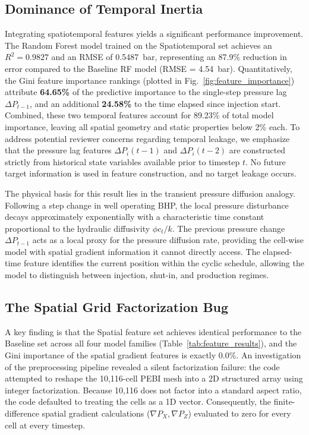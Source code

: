 \documentclass[10pt,twocolumn]{article}
\begin{document}
\subsection{Dominance of Temporal Inertia}
Integrating spatiotemporal features yields a significant performance improvement. The Random Forest model trained on the Spatiotemporal set achieves an $R^2 = 0.9827$ and an RMSE of 0.5487~bar, representing an 87.9\% reduction in error compared to the Baseline RF model (RMSE = 4.54~bar). Quantitatively, the Gini feature importance rankings (plotted in Fig.~\ref{fig:feature_importance}) attribute \textbf{64.65\%} of the predictive importance to the single-step pressure lag $\Delta P_{t-1}$, and an additional \textbf{24.58\%} to the time elapsed since injection start. Combined, these two temporal features account for 89.23\% of total model importance, leaving all spatial geometry and static properties below 2\% each. To address potential reviewer concerns regarding temporal leakage, we emphasize that the pressure lag features $\Delta P_i(t-1)$ and $\Delta P_i(t-2)$ are constructed strictly from historical state variables available prior to timestep $t$. No future target information is used in feature construction, and no target leakage occurs.

The physical basis for this result lies in the transient pressure diffusion analogy. Following a step change in well operating BHP, the local pressure disturbance decays approximately exponentially with a characteristic time constant proportional to the hydraulic diffusivity $\phi c_t / k$. The previous pressure change $\Delta P_{t-1}$ acts as a local proxy for the pressure diffusion rate, providing the cell-wise model with spatial gradient information it cannot directly access. The elapsed-time feature identifies the current position within the cyclic schedule, allowing the model to distinguish between injection, shut-in, and production regimes.

\subsection{The Spatial Grid Factorization Bug} \label{sec:grid_bug}
A key finding is that the Spatial feature set achieves identical performance to the Baseline set across all four model families (Table~\ref{tab:feature_results}), and the Gini importance of the spatial gradient features is exactly 0.0\%. An investigation of the preprocessing pipeline revealed a silent factorization failure: the code attempted to reshape the 10,116-cell PEBI mesh into a 2D structured array using integer factorization. Because 10,116 does not factor into a standard aspect ratio, the code defaulted to treating the cells as a 1D vector. Consequently, the finite-difference spatial gradient calculations ($\nabla P_X, \nabla P_Z$) evaluated to zero for every cell at every timestep.
\end{document}
